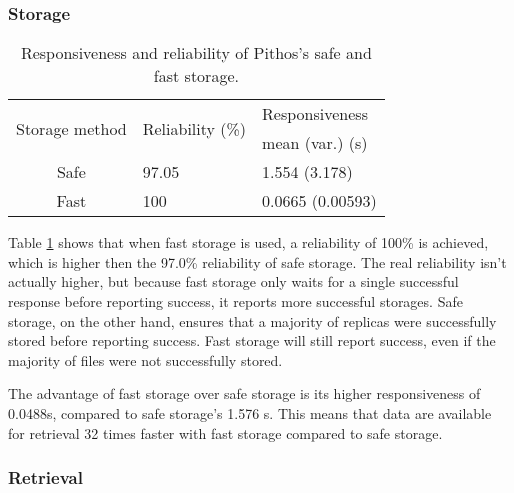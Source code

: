 \subsubsection{Storage}
\begin{table}[htbp]
\centering
\begin{tabular}{|c|l|l|}
\hline
\multirow{2}{*}{Storage method} & \multirow{2}{*}{Reliability (\%)} & Responsiveness \\
               &             & mean (var.) (s) \\
\hline
Safe    &  97.05  &   1.554 (3.178)  \\
Fast    &  100     &   0.0665 (0.00593) \\
\hline
\end{tabular}
\caption{Responsiveness and reliability of Pithos's safe and fast storage.}
\label{tab_pithos_storage_results}
\end{table}
%
Table \ref{tab_pithos_storage_results} shows that when fast storage is used, a reliability of 100\% is achieved, which is higher then the 97.0\% reliability of safe storage. The real reliability isn't actually higher, but because fast storage only waits for a single successful response before reporting success, it reports more successful storages. Safe storage, on the other hand, ensures that a majority of replicas were successfully stored before reporting success. Fast storage will still report success, even if the majority of files were not successfully stored.

The advantage of fast storage over safe storage is its higher responsiveness of 0.0488s, compared to safe storage's 1.576 s. This means that data are available for retrieval 32 times faster with fast storage compared to safe storage.

\subsubsection{Retrieval}

